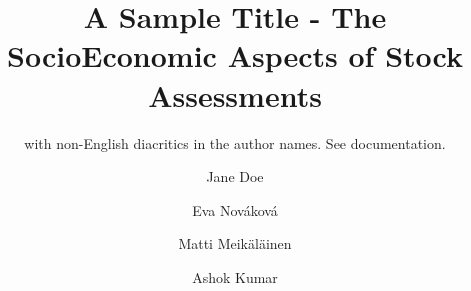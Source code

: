 \documentclass[
  oneside,
  open=any]{scrbook}
\title{A Sample Title - The SocioEconomic Aspects of Stock Assessments}
\subtitle{with non-English diacritics in the author names. See
documentation.}
\author{Jane Doe \and Eva Nováková \and Matti Meikäläinen \and Ashok
Kumar}
\date{}
\begin{document}

  \begin{frontmatter}

\begin{titlepage}


\newcommand{\titlepagepagealign}{
\ifthenelse{\equal{left}{right}}{\raggedleft}{}
\ifthenelse{\equal{left}{center}}{\centering}{}
\ifthenelse{\equal{left}{left}}{\raggedright}{}
}


\newcommand{\titleandsubtitle}{
{{\large{\bfseries{\nohyphens{A Sample Title - The SocioEconomic Aspects
of Stock Assessments}}}}\par
}%

\vspace{\betweentitlesubtitle}
{
{\large{\textit{\nohyphens{with non-English diacritics in the author
names. See documentation.}}}}\par
}}
\newcommand{\titlepagetitleblock}{
\titleandsubtitle
}

\newcommand{\authorstyle}[1]{{\large{#1}}}

\newcommand{\affiliationstyle}[1]{{\large{#1}}}

\newcommand{\titlepageauthorblock}{
{\authorstyle{\nohyphens{Jane
Doe}{\textsuperscript{1}}\textsuperscript{,}{\textsuperscript{2}},  \nohyphens{Eva
Nováková}{\textsuperscript{3}},  \nohyphens{Matti
Meikäläinen}{\textsuperscript{4}}\textsuperscript{,}{\textsuperscript{*}} and \nohyphens{Ashok
Kumar}{\textsuperscript{2}}\textsuperscript{,}{\textsuperscript{5}}}}}

\newcommand{\titlepageaffiliationblock}{
\hangindent=1em
\hangafter=1
{\affiliationstyle{
{1}.~Minnesota Department of Natural Resources,~500 Lafayette Road Saint
Paul, MN 55155
\par\hangindent=1em\hangafter=1{2}.~University of Minnesota,~Department
of Mathematics
\par\hangindent=1em\hangafter=1{3}.~Czech University of Life
Sciences,~Družstevní 666, Vikýřovice, Czechia
\par\hangindent=1em\hangafter=1{4}.~University of Kemijärvi,~Department
of Biological and Environmental Science,~Kylmäniementie 79, 98120,
KEMIJÄRVI, Finland
\par\hangindent=1em\hangafter=1{5}.~HØnefoss Institute,~R Tradição 35,
Portugal 2950-726


\vspace{1\baselineskip} 
* \textit{Correspondence:}~Matti Meikäläinen~matti@jy.fi
}}
}
\newcommand{\headerstyled}{%
{The Publisher}
}
\newcommand{\footerstyled}{%
{\large{NOAA Fisheries OpenSci\\
Tools for Open Science\\
\url{https://github.com/nmfs-opensci}\strut \\}}
}
\newcommand{\datestyled}{%
{}
}



\end{titlepage}
\end{frontmatter}
\end{document}
